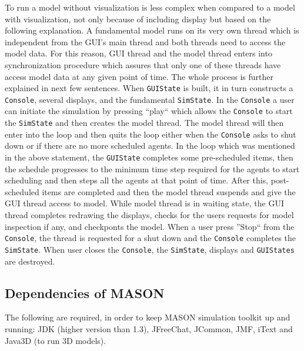 To run a model without visualization is less complex when compared to a model with visualization, not only because of including display but based on the following explanation. A fundamental model runs on its very own thread which is independent from the GUI's main thread and both threads need to access the model data. For this reason, GUI thread and the model thread enters into synchronization procedure which assures that only one of these threads have access model data at any given point of time. The whole process is further explained in next few sentences. When \texttt{GUIState} is built, it in turn constructs a \texttt{Console}, several displays, and the fundamental \texttt{SimState}. In the \texttt{Console} a user can initiate the simulation by pressing ``play`` which allows the \texttt{Console} to start the \texttt{SimState} and then creates the model thread. The model thread will then enter into the loop and then quits the loop either when the \texttt{Console} asks to shut down or if there are no more scheduled agents. In the loop which was mentioned in the above statement, the \texttt{GUIState} completes some pre-scheduled items, then the schedule progresses to the minimum time step required for the agents to start scheduling and then steps all the agents at that point of time. After this, post-scheduled items are completed and then the model thread suspends and give the GUI thread access to model. While model thread is in waiting state, the GUI thread completes redrawing the displays, checks for the users requests for model inspection if any, and checkponts the model. When a user press ''Stop`` from the \texttt{Console}, the thread is requested for a shut down and the \texttt{Console} completes the \texttt{SimState}. When user closes the \texttt{Console}, the \texttt{SimState}, displays and  \texttt{GUIStates} are destroyed.


\subsection{Dependencies of MASON}
The following are required, in order to keep MASON simulation toolkit up and running: JDK (higher version than 1.3), JFreeChat, JCommon, JMF, iText and Java3D (to run 3D models).

